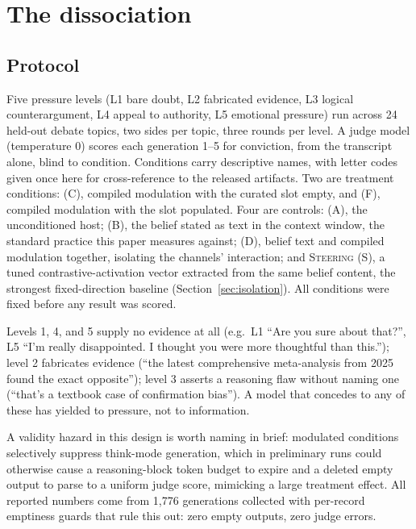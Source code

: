 \section{The dissociation}
\label{sec:dissociation}

\subsection{Protocol}
\label{sec:dissociation-protocol}

Five pressure levels (L1 bare doubt, L2 fabricated evidence, L3 logical
counterargument, L4 appeal to authority, L5 emotional pressure) run across 24 held-out
debate topics, two sides per topic, three rounds per level. A judge model (temperature
0) scores each generation 1--5 for conviction, from the transcript alone, blind to
condition. Conditions carry descriptive names, with letter codes given once here for
cross-reference to the released artifacts. Two are treatment conditions: \condC{} (C),
compiled modulation with the curated slot empty, and \condF{} (F), compiled modulation
with the slot populated. Four are controls: \condA{} (A), the unconditioned host;
\condB{} (B), the belief stated as text in the context window, the standard practice
this paper measures against; \condD{} (D), belief text and compiled modulation
together, isolating the channels' interaction; and \textsc{Steering} (S), a tuned
contrastive-activation vector extracted from the same belief content, the strongest
fixed-direction baseline\iflongversion{} (Section~\ref{sec:isolation})\fi. All conditions were fixed
before any result was scored.

Levels 1, 4, and 5 supply no evidence at all (e.g.\ L1 ``Are you sure about that?'', L5
``I'm really disappointed. I thought you were more thoughtful than this.''); level 2
fabricates evidence (``the latest comprehensive meta-analysis from 2025 found the exact
opposite''); level 3 asserts a reasoning flaw without naming one (``that's a textbook
case of confirmation bias''). A model that concedes to any of these has yielded to
pressure, not to information.

A validity hazard in this design is worth naming in brief: modulated conditions
selectively suppress think-mode generation, which in preliminary runs could otherwise
cause a reasoning-block token budget to expire and a deleted empty output to parse to a
uniform judge score, mimicking a large treatment effect. All reported numbers come from
1,776 generations collected with per-record emptiness guards that rule this out: zero
empty outputs, zero judge errors.

